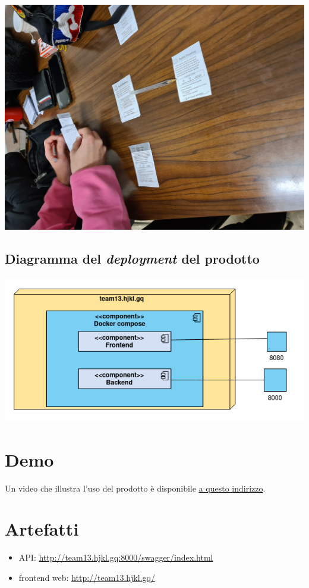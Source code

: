 \documentclass{article}
\begin{document}
\includegraphics[width=\textwidth]{essence-4-4}

\subsection{Diagramma del \emph{deployment} del prodotto}

\includegraphics[width=\textwidth]{deployment}

\section{Demo}

Un video che illustra l'uso del prodotto è disponibile
\underline{\href{https://liveunibo-my.sharepoint.com/:v:/g/personal/federica_grisendi_studio_unibo_it/EaOojpKKw9ZIreuXeDcHFicBxvcOjSGP4zPOGXMwKPtEcA?e=QVfOKm}{a questo indirizzo}}.

\section{Artefatti}

\begin{itemize}
	\item API: \url{http://team13.hjkl.gq:8000/swagger/index.html}
	\item frontend web: \url{http://team13.hjkl.gq/}
\end{itemize}
\end{document}
